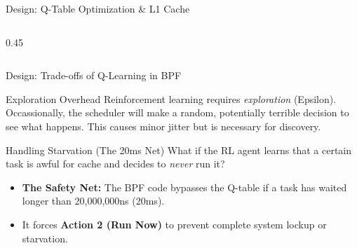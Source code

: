 \documentclass[aspectratio=169]{beamer}
\begin{document}
\begin{frame}{Design: Q-Table Optimization \& L1 Cache}
\begin{columns}[T]
\begin{column}{0.45\textwidth}
        \end{column}
    \end{columns}
\end{frame}

\begin{frame}{Design: Trade-offs of Q-Learning in BPF}
    \begin{alertblock}{Exploration Overhead}
        \small
        Reinforcement learning requires \textit{exploration} (Epsilon). Occassionally, the scheduler will make a random, potentially terrible decision to see what happens. This causes minor jitter but is necessary for discovery.
    \end{alertblock}

    \begin{block}{Handling Starvation (The 20ms Net)}
        \small
        What if the RL agent learns that a certain task is awful for cache and decides to \textit{never} run it?
        \begin{itemize}
            \item \textbf{The Safety Net:} The BPF code bypasses the Q-table if a task has waited longer than 20,000,000ns (20ms).
            \item It forces \textbf{Action 2 (Run Now)} to prevent complete system lockup or starvation.
        \end{itemize}
    \end{block}
\end{frame}

\end{document}
